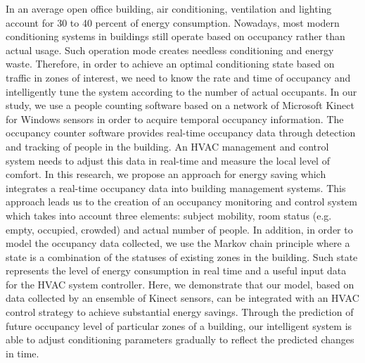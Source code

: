 In an average open office building, air conditioning, ventilation and
lighting account for 30 to 40 percent of energy consumption. Nowadays,
most modern conditioning systems in buildings still operate based on
occupancy rather than actual usage. Such operation mode creates
needless conditioning and energy waste. Therefore, in order to achieve
an optimal conditioning state based on  traffic in zones of interest,
we need to know the rate and time of occupancy and intelligently tune
the system according to the  number of actual occupants.  In our
study, we use a people counting software based on a network of
Microsoft Kinect for Windows sensors in order to acquire temporal
occupancy information. The occupancy counter software provides
real-time occupancy data through detection and tracking of people in
the building.  An HVAC management and control system needs to adjust
this data in real-time and measure the local level of comfort.  In
this research, we propose an approach for energy saving which
integrates a real-time occupancy data into building management
systems. This approach leads us to the creation of an occupancy
monitoring and control system which takes into account three elements:
subject mobility, room status (e.g. empty, occupied, crowded) and
actual number of people.  In addition, in order to model the occupancy
data collected, we use the Markov chain principle where a state is a
combination of the statuses of existing zones in the building. Such
state represents the level of energy consumption in real time and a
useful input data for the HVAC system controller.  Here, we
demonstrate that our model, based on data collected by an ensemble of
Kinect sensors, can be integrated with an HVAC control strategy to
achieve substantial energy savings. Through the prediction of future
occupancy level of particular zones of a building, our intelligent
system is able to adjust conditioning parameters gradually to reflect
the predicted changes in time.  